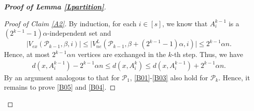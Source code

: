 \documentclass[11pt, a4paper]{article}
\theoremstyle{definition}
\newcommand{\<}{\subseteq}
\begin{document}
\begin{proof}[\bf Proof of Lemma \ref{Lpartition}]
\begin{proof}[Proof of Claim \ref{A2}]

By induction, for each $i\in [s]$, we know that $A_i^{k-1}$ is a $(2^{k-1}-1) \alpha$-independent set and $$\big|V_{ex}(\mathcal{P}_{k-1},\beta,i)\big|\le \big|V_{ne}^L(\mathcal{P}_{k-1},\beta+(2^{k-1}-1)\alpha, i)\big|\le 2^{k-1}\alpha n.
$$
Hence, at most $2^{k-1}\alpha n$ vertices are exchanged in the $k$-th step. Thus, we have 
\begin{align}\label{DegreeC}
    d(x,A_i^{k-1})-2^{k-1} \alpha n \le d(x,A_i^k)\le d(x,A_i^{k-1})+2^{k-1} \alpha n.
\end{align}
By an argument analogous to that for $\mathcal{P}_1$, \ref{B01}-\ref{B03} also hold for $\mathcal{P}_k$. Hence, it remains to prove \ref{B05} and \ref{B04}.


\end{proof}
\end{proof}
\end{document}
